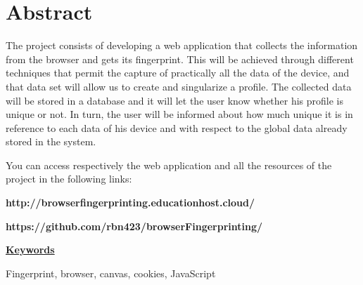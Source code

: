 \chapter*{Abstract}

The project consists of developing a web application that collects the information from the browser and gets its fingerprint. This will be achieved through different techniques that permit the capture of practically all the data of the device, and that data set will allow us to create and singularize a profile. The collected data will be stored in a database and it will let the user know whether his profile is unique or not. In turn, the user will be informed about how much unique it is in reference to each data of his device and with respect to the global data already stored in the system. \par

\noindent
You can access respectively the web application and all the resources of the project in the following links: \par
\textbf{http://browserfingerprinting.educationhost.cloud/} \par

\textbf{https://github.com/rbn423/browserFingerprinting/} \par
\vspace{12mm}
\noindent
\underline{\Large{\textbf{Keywords}}}\par
\vspace{7mm}
\noindent
\normalsize{Fingerprint, browser, canvas, cookies, JavaScript}